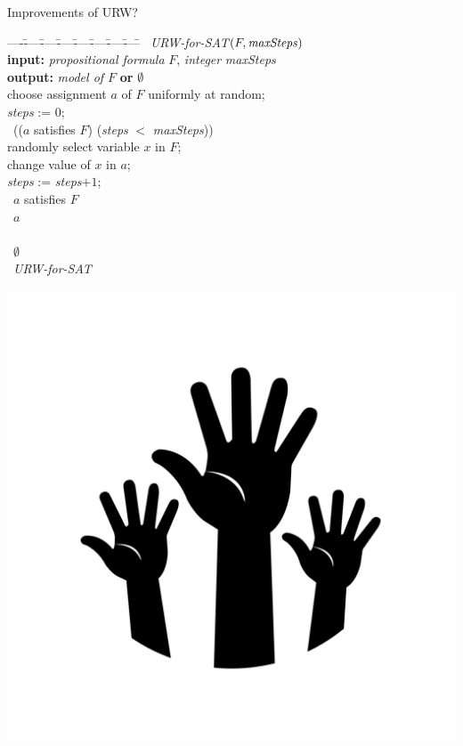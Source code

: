 \begin{frame}[c]{Improvements of URW?}

{\footnotesize
\begin{tabbing}
----\=----\=----\=----\=----\=----\=----\=----\=\kill
\pscProc\ {\em URW-for-SAT$(F,\mbox{\emph{maxSteps}})$}\\
\> {\bf input:} {\em propositional formula} $F$, \emph{integer} \emph{maxSteps}\\
\> {\bf output:} {\em model of $F$} {\bf or} $\emptyset$\\[1mm]
\> choose assignment $a$ of $F$ uniformly at random;\\
\> \emph{steps} := 0; \\
\> \pscWhile\ \pscNot(($a$ satisfies $F$) \pscAnd{}
         (\emph{steps} $<$ \emph{maxSteps})) \pscDo\\
\> \> randomly select variable $x$ in $F$;\\ 
\> \> change value of $x$ in $a$;\\ 
\> \> \emph{steps} := \emph{steps}$+1$;\\
\> \> \pscIf\ $a$ satisfies $F$ \pscThen \\
\> \> \> \pscReturn\ $a$\\
\> \pscEnd\\
\> \pscReturn\ $\emptyset$\\
\pscEnd\ {\em URW-for-SAT}
\end{tabbing}
}

\centering
\includegraphics[scale=.05]{images/hands.png}

\end{frame}
